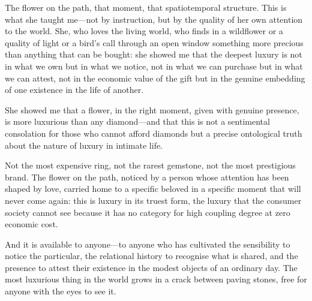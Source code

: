 \vspace{0.5em}

\noindent
{}

\vspace{0.5em}

\noindent
The flower on the path, that moment, that spatiotemporal structure. This is what she taught me---not by instruction, but by the quality of her own attention to the world. She, who loves the living world, who finds in a wildflower or a quality of light or a bird's call through an open window something more precious than anything that can be bought: she showed me that the deepest luxury is not in what we own but in what we notice, not in what we can purchase but in what we can attest, not in the economic value of the gift but in the genuine embedding of one existence in the life of another.

\vspace{0.5em}

\noindent
She showed me that a flower, in the right moment, given with genuine presence, is more luxurious than any diamond---and that this is not a sentimental consolation for those who cannot afford diamonds but a precise ontological truth about the nature of luxury in intimate life.

\vspace{0.5em}

\noindent
{}

\vspace{0.5em}

\noindent
Not the most expensive ring, not the rarest gemstone, not the most prestigious brand. The flower on the path, noticed by a person whose attention has been shaped by love, carried home to a specific beloved in a specific moment that will never come again: this is luxury in its truest form, the luxury that the consumer society cannot see because it has no category for high coupling degree at zero economic cost.

\vspace{0.5em}

\noindent
And it is available to anyone---to anyone who has cultivated the sensibility to notice the particular, the relational history to recognise what is shared, and the presence to attest their existence in the modest objects of an ordinary day. The most luxurious thing in the world grows in a crack between paving stones, free for anyone with the eyes to see it.

